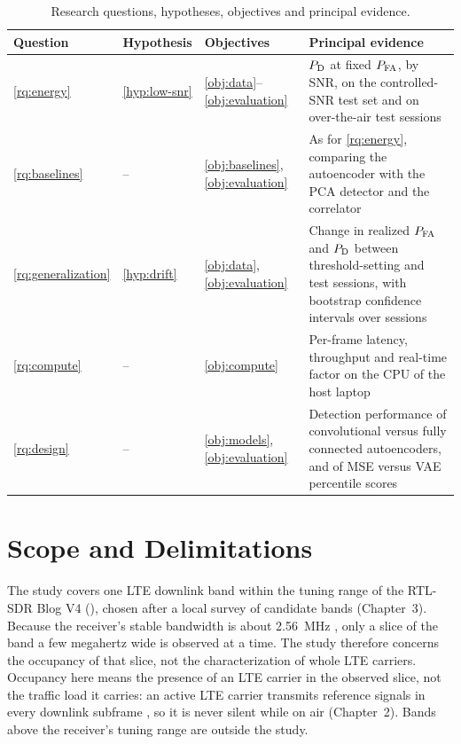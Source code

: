\begin{table}[htbp]
  \centering
  \caption{Research questions, hypotheses, objectives and principal evidence.}
  \label{tab:rq-map}
  \small
  \begin{tabularx}{\textwidth}{@{}l l l X@{}}
    \toprule
    Question & Hypothesis & Objectives & Principal evidence \\
    \midrule
    \ref{rq:energy} & \ref{hyp:low-snr} & \ref{obj:data}--\ref{obj:evaluation} & $P_{\mathrm{D}}$ at fixed $P_{\mathrm{FA}}$, by SNR, on the controlled-SNR test set and on over-the-air test sessions \\
    \ref{rq:baselines} & -- & \ref{obj:baselines}, \ref{obj:evaluation} & As for \ref{rq:energy}, comparing the autoencoder with the PCA detector and the \syncsignal{} correlator \\
    \ref{rq:generalization} & \ref{hyp:drift} & \ref{obj:data}, \ref{obj:evaluation} & Change in realized $P_{\mathrm{FA}}$ and $P_{\mathrm{D}}$ between threshold-setting and test sessions, with bootstrap confidence intervals over sessions \\
    \ref{rq:compute} & -- & \ref{obj:compute} & Per-frame latency, throughput and real-time factor on the CPU of the host laptop \\
    \ref{rq:design} & -- & \ref{obj:models}, \ref{obj:evaluation} & Detection performance of convolutional versus fully connected autoencoders, and of MSE versus VAE percentile scores \\
    \bottomrule
  \end{tabularx}
\end{table}

\section{Scope and Delimitations}
\label{sec:scope}

The study covers one LTE downlink band within the tuning range of the RTL-SDR Blog V4 (\TargetBand), chosen after a local survey of candidate bands (Chapter~3). Because the receiver's stable bandwidth is about \qty{2.56}{\mega\hertz} \parencite{rtlsdrblog2024}, only a slice of the band a few megahertz wide is observed at a time. The study therefore concerns the occupancy of that slice, not the characterization of whole LTE carriers. Occupancy here means the presence of an LTE carrier in the observed slice, not the traffic load it carries: an active LTE carrier transmits reference signals in every downlink subframe \parencite[clause~6.10.1]{3gpp2026a}, so it is never silent while on air (Chapter~2). Bands above the receiver's tuning range are outside the study.

